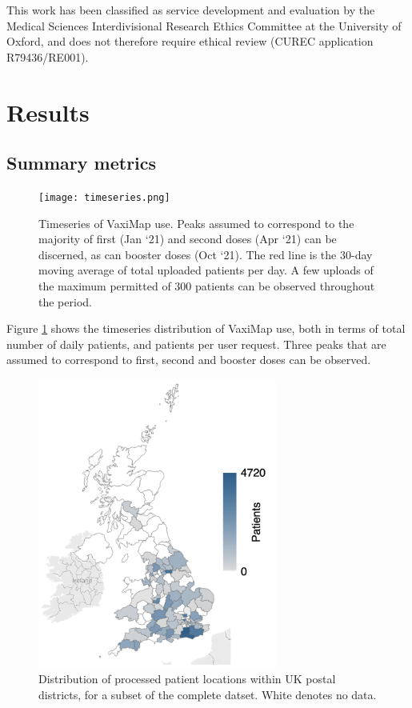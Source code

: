 \documentclass[review]{elsarticle}
\def\vm{VaxiMap}
\begin{document}
This work has been classified as service development and evaluation by the Medical Sciences Interdivisional Research Ethics Committee at the University of Oxford, and does not therefore require ethical review (CUREC application R79436/RE001). 

\section{Results}

\subsection{Summary metrics}

\begin{figure}[H]
\centering
\texttt{[image: timeseries.png]}
\caption{Timeseries of \vm{} use. Peaks assumed to correspond to the majority of first (Jan `21) and second doses (Apr `21) can be discerned, as can booster doses (Oct `21). The red line is the 30-day moving average of total uploaded patients per day. A few uploads of the maximum permitted of 300 patients can be observed throughout the period.}
\label{timeseries}
\end{figure}

Figure \ref{timeseries} shows the timeseries distribution of \vm{} use, both in terms of total number of daily patients, and patients per user request. Three peaks that are assumed to correspond to first, second and booster doses can be observed. 

\begin{figure}[H]
\centering
\includegraphics[width=0.7\textwidth]{uk_overview.png}
\caption{Distribution of processed patient locations within UK postal districts, for a subset of the complete datset. White denotes no data.}
\label{uk_overview}
\end{figure}
\end{document}
